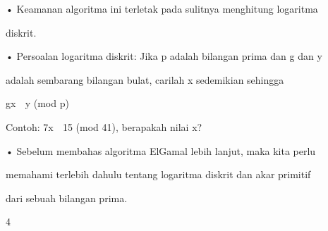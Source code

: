 \documentclass{article}
\begin{document}

• Keamanan algoritma ini terletak pada sulitnya menghitung logaritma 

diskrit.

• Persoalan logaritma diskrit: Jika p adalah bilangan prima dan g dan y 

adalah sembarang bilangan bulat, carilah x sedemikian sehingga 



gx  y (mod p)

 Contoh:   7x  15 (mod 41), berapakah nilai x?

• Sebelum membahas algoritma ElGamal lebih lanjut, maka kita perlu 

memahami terlebih dahulu  tentang logaritma diskrit dan akar primitif 

dari sebuah bilangan prima.

4
\end{document}
